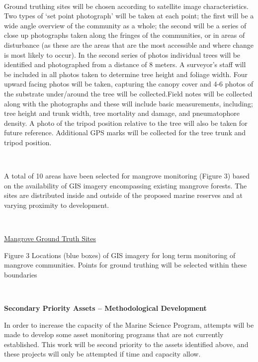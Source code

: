 \documentclass[version=last,
    paper=a4,                               %
    10pt,                                   %
    dvipsnames,
    oneside,                              %
    headings=openany,                       %
    open=any,
    BCOR=7mm,                               %
    DIV=15,     %
]{scrbook}
\begin{document}
~

Ground truthing sites will be chosen according to satellite image
characteristics. Two types of `set point photograph' will be taken at
each point; the first will be a wide angle overview of the community as
a whole; the second will be a series of close up photographs taken along
the fringes of the communities, or in areas of disturbance (as these are
the areas that are the most accessible and where change is most likely
to occur). In the second series of photos individual trees will be
identified and photographed from a distance of 8 meters. A surveyor's
staff will be included in all photos taken to determine tree height and
foliage width. Four upward facing photos will be taken, capturing the
canopy cover and 4-6 photos of the substrate under/around the tree will
be collected.Field notes will be collected along with the photographs
and these will include basic measurements, including; tree height and
trunk width, tree mortality and damage, and pneumatophore density. A
photo of the tripod position relative to the tree will also be taken for
future reference. Additional GPS marks will be collected for the tree
trunk and tripod position.

~

A total of 10 areas have been selected for mangrove monitoring (Figure
3) based on the availability of GIS imagery encompassing existing
mangrove forests. The sites are distributed inside and outside of the
proposed marine reserves and at varying proximity to development.

~

\href{http://internal-data.dpaw.wa.gov.au/dataset/4afb0762-81ee-4d29-aa12-2728f725d85d/resource/ea96c0ea-1409-4c6d-884a-6fc7e9b084c1/download/figure-3.pdf}{Mangrove
Ground Truth Sites}

Figure 3 Locations (blue boxes) of GIS imagery for long term monitoring
of mangrove communities. Points for ground truthing will be selected
within these boundaries

~

\textbf{Secondary Priority Assets -- Methodological Development}

In order to increase the capacity of the Marine Science Program,
attempts will be made to develop some asset monitoring programs that are
not currently established. This work will be second priority to the
assets identified above, and these projects will only be attempted if
time and capacity allow.

~
\end{document}
